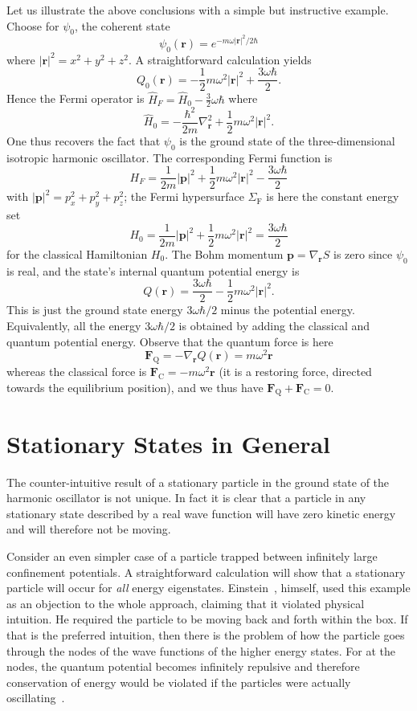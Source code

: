 \documentclass[11pt]{article}%
\begin{document}
Let us illustrate the above conclusions with a simple but instructive example.
Choose for $\psi_{0}$, the coherent state
\[
\psi_{0}(\mathbf{r})=e^{-m\omega|\mathbf{r}|^{2}/2\hbar}%
\]
where $|\mathbf{r}|^{2}=x^{2}+y^{2}+z^{2}$. A straightforward calculation
yields%
\[
Q_{0}(\mathbf{r})=-\frac{1}{2}m\omega^{2}|\mathbf{r}|^{2}+\frac{3\omega\hbar
}{2}.
\]
Hence the Fermi operator is $\widehat{H}_{F}=\widehat{H}_{0}-\frac{3}{2}%
\omega\hbar$ where
\[
\widehat{H}_{0}=-\frac{\hbar^{2}}{2m}\nabla_{\mathbf{r}}^{2}+\frac{1}%
{2}m\omega^{2}|\mathbf{r}|^{2}.
\]
One thus recovers the fact that $\psi_{0}$ is the ground state of the
three-dimensional isotropic harmonic oscillator. The corresponding Fermi
function is
\[
H_{F}=\frac{1}{2m}|\mathbf{p}|^{2}+\frac{1}{2}m\omega^{2}|\mathbf{r}%
|^{2}-\frac{3\omega\hbar}{2}%
\]
with $|\mathbf{p}|^{2}=p_{x}^{2}+p_{y}^{2}+p_{z}^{2}$; the Fermi hypersurface
$\Sigma_{\mathrm{F}}$ is here the constant energy set
\[
H_{0}=\frac{1}{2m}|\mathbf{p}|^{2}+\frac{1}{2}m\omega^{2}|\mathbf{r}%
|^{2}=\frac{3\omega\hbar}{2}%
\]
for the classical Hamiltonian $H_{0}$. The Bohm momentum $\mathbf{p}%
=\nabla_{\mathbf{r}}S$ is zero since $\psi_{0}$ is real, and the state's
internal quantum potential energy is
\begin{equation}
Q(\mathbf{r})=\frac{3\omega\hbar}{2}-\frac{1}{2}m\omega^{2}|\mathbf{r}|^{2}.
\label{qr}%
\end{equation}
This is just the ground state energy $3\omega\hbar/2$ minus the potential
energy. Equivalently, all the energy $3\omega\hbar/2$ is obtained by adding
the classical and quantum potential energy. Observe that the quantum force is
here
\[
\mathbf{F}_{\mathrm{Q}}=-\nabla_{\mathbf{r}}Q(\mathbf{r})=m\omega
^{2}\mathbf{r}%
\]
whereas the classical force is $\mathbf{F}_{\mathrm{C}}=-m\omega^{2}%
\mathbf{r}$ (it is a restoring force, directed towards the equilibrium
position), and we thus have $\mathbf{F}_{\mathrm{Q}}+\mathbf{F}_{\mathrm{C}%
}=0$.

\section{Stationary States in General\label{sec:other}}

The counter-intuitive result of a stationary particle in the ground state of
the harmonic oscillator is not unique. In fact it is clear that a particle in
any stationary state described by a real wave function will have zero kinetic
energy and will therefore not be moving.

Consider an even simpler case of a particle trapped between infinitely large
confinement potentials. A straightforward calculation will show that a
stationary particle will occur for \emph{all} energy eigenstates.
Einstein~\cite{ae53}, himself, used this example as an objection to the whole
approach, claiming that it violated physical intuition. He required the
particle to be moving back and forth within the box. If that is the preferred
intuition, then there is the problem of how the particle goes through the
nodes of the wave functions of the higher energy states. For at the nodes, the
quantum potential becomes infinitely repulsive and therefore conservation of
energy would be violated if the particles were actually
oscillating~\cite{dbbh85}.
\end{document}
